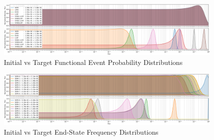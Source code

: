 \begin{landscape}
\begin{figure}[ht!]
  \centering
\includegraphics[width=\textwidth]{parts/4_learning/1_param/figs/conditional_events_prior.png}
    \caption{Initial vs Target Functional Event Probability Distributions}
    \label{fig:conditionals_initial}
\end{figure}

\begin{figure}[hb!]
\centering
\includegraphics[width=\textwidth]{parts/4_learning/1_param/figs/end_states_prior.png}
    \caption{Initial vs Target End-State Frequency Distributions}
     \label{fig:end-states_initial}
\end{figure}
\end{landscape}

